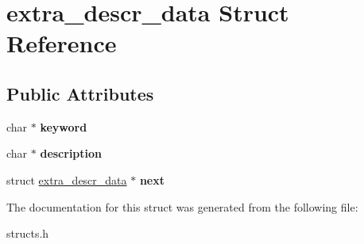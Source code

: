 \hypertarget{structextra__descr__data}{\section{extra\-\_\-descr\-\_\-data Struct Reference}
\label{structextra__descr__data}
}
\subsection*{Public Attributes}
\begin{DoxyCompactItemize}
\item 
\hypertarget{structextra__descr__data_a0173f2f9f733957566645b4a5b5b4d1e}{char $\ast$ {\bfseries keyword}}\label{structextra__descr__data_a0173f2f9f733957566645b4a5b5b4d1e}

\item 
\hypertarget{structextra__descr__data_a13f183c6a3726eb38afd80e8e2d0cf84}{char $\ast$ {\bfseries description}}\label{structextra__descr__data_a13f183c6a3726eb38afd80e8e2d0cf84}

\item 
\hypertarget{structextra__descr__data_a977c267a37176ab1befd09d25f6c7a06}{struct \hyperlink{structextra__descr__data}{extra\-\_\-descr\-\_\-data} $\ast$ {\bfseries next}}\label{structextra__descr__data_a977c267a37176ab1befd09d25f6c7a06}

\end{DoxyCompactItemize}


The documentation for this struct was generated from the following file\-:\begin{DoxyCompactItemize}
\item 
structs.\-h\end{DoxyCompactItemize}
